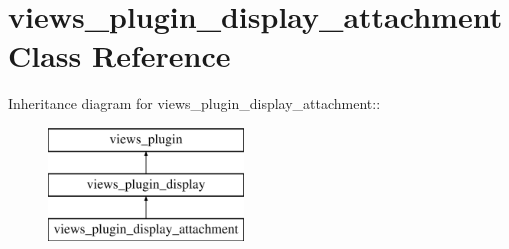 \hypertarget{classviews__plugin__display__attachment}{
\section{views\_\-plugin\_\-display\_\-attachment Class Reference}
\label{classviews__plugin__display__attachment}
}
Inheritance diagram for views\_\-plugin\_\-display\_\-attachment::\begin{figure}[H]
\begin{center}
\leavevmode
\includegraphics[height=3cm]{classviews__plugin__display__attachment}
\end{center}
\end{figure}
